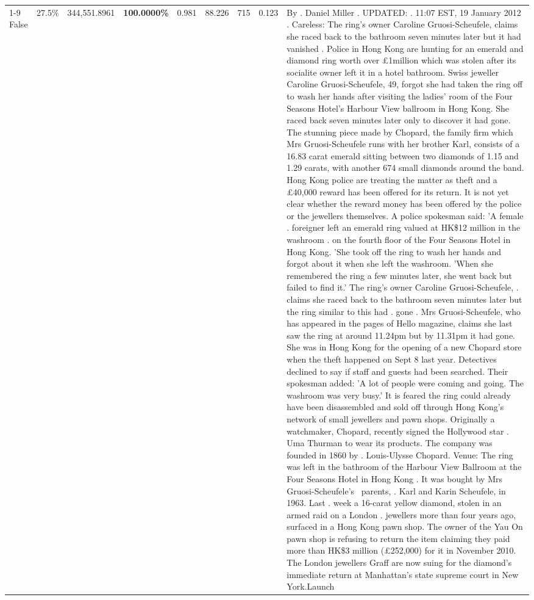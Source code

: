\begin{table}[H]
\begin{tabular}{lllrlllll}
\cline{1-9} \cline{2-9}
False & 27.5\% & 344,551.8961 & \bfseries \color{red} 100.0000\% & 0.981 & 88.226 & 715 & 0.123 & By . Daniel Miller . UPDATED: . 11:07 EST, 19 January 2012 . Careless: The ring's owner Caroline Gruosi-Scheufele, claims she raced back to the bathroom seven minutes later but it had vanished . Police in Hong Kong are hunting for an emerald and diamond ring worth over £1million which was stolen after its socialite owner left it in a hotel bathroom. Swiss jeweller Caroline Gruosi-Scheufele, 49, forgot she had taken the ring off to wash her hands after visiting the ladies' room of the Four Seasons Hotel's Harbour View ballroom in Hong Kong. She raced back seven minutes later only to discover it had gone. The stunning piece made by Chopard, the family firm which Mrs Gruosi-Scheufele runs with her brother Karl, consists of a 16.83 carat emerald sitting between two diamonds of 1.15 and 1.29 carats, with another 674 small diamonds around the band. Hong Kong police are treating the matter as theft and a £40,000 reward has been offered for its return. It is not yet clear whether the reward money has been offered by the police or the jewellers themselves. A police spokesman said: 'A female . foreigner left an emerald ring valued at HK\$12 million in the washroom . on the fourth floor of the Four Seasons Hotel in Hong Kong. 'She took off the ring to wash her hands and forgot about it when she left the washroom. 'When she remembered the ring a few minutes later, she went back but failed to find it.' The ring's owner Caroline Gruosi-Scheufele, . claims she raced back to the bathroom seven minutes later but the ring similar to this had . gone . Mrs Gruosi-Scheufele, who has appeared in the pages of Hello magazine, claims she last saw the ring at around 11.24pm but by 11.31pm it had gone. She was in Hong Kong for the opening of a new Chopard store when the theft happened on Sept 8 last year. Detectives declined to say if staff and guests had been searched. Their spokesman added: 'A lot of people were coming and going. The washroom was very busy.' It is feared the ring could already have been disassembled and sold off through Hong Kong's network of small jewellers and pawn shops. Originally a watchmaker, Chopard, recently signed the Hollywood star . Uma Thurman to wear its products. The company was founded in 1860 by . Louis-Ulysse Chopard. Venue: The ring was left in the bathroom of the Harbour View Ballroom at the Four Seasons Hotel in Hong Kong . It was bought by Mrs Gruosi-Scheufele's  parents, . Karl and Karin Scheufele, in 1963. Last . week a 16-carat yellow diamond, stolen in an armed raid on a London . jewellers more than four years ago, surfaced in a Hong Kong pawn shop. The owner of the Yau On pawn shop is refusing to return the item claiming they paid more than HK\$3 million (£252,000) for it in November 2010. The London jewellers Graff are now suing for the diamond’s immediate return at Manhattan’s state supreme court in New York.Launch \\

\end{tabular}
\end{table}
